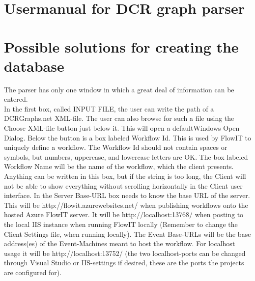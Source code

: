 \appendix
\newpage






\section{Usermanual for DCR graph parser \label{sec:UsermanualForDcrGraphParser}}
\section{Possible solutions for creating the database \label{sec:SolutionsForCreatingTheDatabaseAppendix}}
The parser has only one window in which a great deal of information can be entered. \\
In the first box, called INPUT FILE, the user can write the path of a DCRGraphs.net XML-file. The user can also browse for such a file using the Choose XML-file button just below it. This will open a defaultWindows Open Dialog. Below the button is a box labeled Workflow Id. This is used by FlowIT to uniquely define a workflow.  \newline
The Workflow Id should not contain spaces or symbols, but numbers, uppercase, and lowercase letters are OK. \newline
The box labeled Workflow Name will be the name of the workflow, which the client presents. Anything can be written in this box, but if the string is too long, the Client will not be able to show everything without scrolling horizontally in the Client user interface. \newline
In the Server Base-URL box needs to know the base URL of the server. \newline
This will be http://flowit.azurewebsites.net/ when publishing workflows onto the hosted Azure FlowIT server. It will be http://localhost:13768/ when posting to the local IIS instance when running FlowIT locally (Remember to change the Client Settings file, when running locally). \newline
The Event Base-URLs will be the base address(es) of the Event-Machines meant to host the workflow. For localhost usage it will be http://localhost:13752/ (the two localhost-ports can be changed through Visual Studio or IIS-settings if desired, these are the ports the projects are configured for).  \newline
